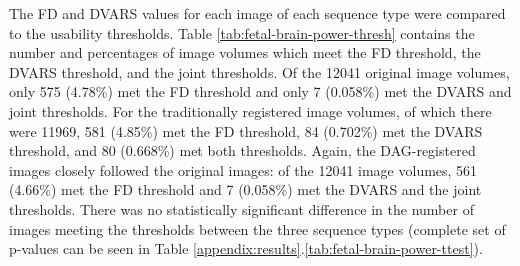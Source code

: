 The FD and DVARS values for each image of each sequence type were compared to the usability thresholds. Table \ref{tab:fetal-brain-power-thresh} contains the number and percentages of image volumes which meet the FD threshold, the DVARS threshold, and the joint thresholds. Of the 12041 original image volumes, only 575 (4.78\%) met the FD threshold and only 7 (0.058\%) met the DVARS and joint thresholds. For the traditionally registered image volumes, of which there were 11969, 581 (4.85\%) met the FD threshold, 84 (0.702\%) met the DVARS threshold, and 80 (0.668\%) met both thresholds. Again, the DAG-registered images closely followed the original images: of the 12041 image volumes, 561 (4.66\%) met the FD threshold and 7 (0.058\%) met the DVARS and the joint thresholds. There was no statistically significant difference in the number of images meeting the thresholds between the three sequence types (complete set of p-values can be seen in Table \ref{appendix:results}.\ref{tab:fetal-brain-power-ttest}).

